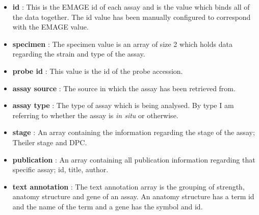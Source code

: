 \begin{itemize}
\item \textbf{id} : This is the EMAGE id of each assay and is the value which binds all of the data together. The id value has been manually configured to correspond with the EMAGE value.
\item \textbf{specimen} : The specimen value is an array of size 2 which holds data regarding the strain and type of the assay.
\item \textbf{probe id} : This value is the id of the probe accession.
\item \textbf{assay source} : The source in which the assay has been retrieved from.
\item \textbf{assay type} : The type of assay which is being analysed. By type I am referring to whether the assay is \textit{in situ} or otherwise.
\item \textbf{stage} : An array containing the information regarding the stage of the assay; Theiler stage and DPC.
\item \textbf{publication} : An array containing all publication information regarding that specific assay; id, title, author.
\item \textbf{text annotation} : The text annotation array is the grouping of strength, anatomy structure and gene of an assay. An anatomy structure has a term id and the name of the term and a gene has the symbol and id.
\end{itemize}

